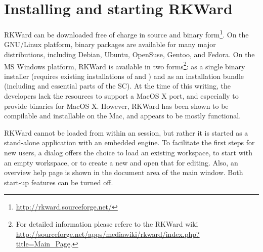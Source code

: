 \section{Installing and starting RKWard}
\label{sec:installing_starting_RKWard}
RKWard can be downloaded free of charge in source and binary form\footnote{\url{http://rkward.sourceforge.net/}}. 
On the GNU/Linux platform, binary packages are available for many major distributions,
including Debian, Ubuntu, OpenSuse, Gentoo, and Fedora. On the MS Windows
platform, RKWard is available in two forms\footnote{For detailed information please refere to the 
RKWard wiki \url{http://sourceforge.net/apps/mediawiki/rkward/index.php?title=Main_Page}.}: as a single binary
installer (requires existing installations of
 and ) and
as an installation bundle (including  and
essential parts of the  SC). At the time of
this writing, the developers lack the resources to support a MacOS X
port, and especially to provide binaries for MacOS X. However, RKWard
has been shown to be compilable and installable on the Mac, and appears
to be mostly functional.

RKWard cannot be loaded from within an 
session, but rather it is started as a stand-alone application with an
embedded  engine. To facilitate the first
steps for new users, a dialog offers the choice to load an existing
workspace, to start with an empty workspace, or to create a new
 and open that for editing. Also, an overview help page is
shown in the document area of the main window. Both start-up features
can be turned off.